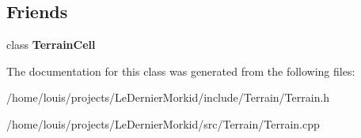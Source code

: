 \subsection*{Friends}
\begin{DoxyCompactItemize}
\item 
\mbox{\label{class_terrain_a403e723a938a88a4e53eb87b478db7c0}} 
class {\bfseries Terrain\+Cell}
\end{DoxyCompactItemize}


The documentation for this class was generated from the following files\+:\begin{DoxyCompactItemize}
\item 
/home/louis/projects/\+Le\+Dernier\+Morkid/include/\+Terrain/Terrain.\+h\item 
/home/louis/projects/\+Le\+Dernier\+Morkid/src/\+Terrain/Terrain.\+cpp\end{DoxyCompactItemize}
